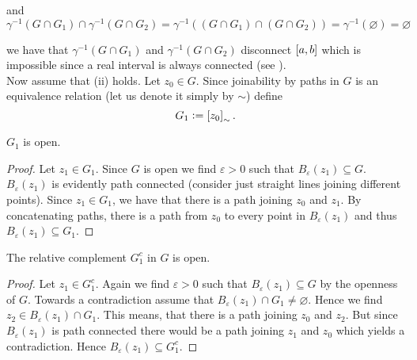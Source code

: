 \begin{enumerate}[label = \textbf{Exercise \arabic*.},wide = 0pt, itemsep=1.5ex]
	\noindent and
	\begin{equation*}
		\gamma^{-1}(G \cap G_1) \cap \gamma^{-1}(G \cap G_2) = \gamma^{-1}((G \cap G_1) \cap (G \cap G_2)) = \gamma^{-1}(\varnothing) = \varnothing  
	\end{equation*}
	
	\noindent we have that $\gamma^{-1}(G \cap G_1)$ and $\gamma^{-1}(G \cap G_2)$ disconnect $\intcc{a,b}$ which is impossible since a real interval is always connected (see \cite[89]{lee:topological_manifolds:2011}).\\

	Now assume that (ii) holds. Let $z_0 \in G$. Since joinability by paths in $G$ is an equivalence relation (let us denote it simply by $\sim$) define
	\begin{equation}
		G_1 := \sbr[0]{z_0}_\sim.
	\end{equation}
		\begin{lemma}
			$G_1$ is open.
			\label{lem:G_1}
		\end{lemma}

	\begin{proof}
		Let $z_1 \in G_1$. Since $G$ is open we find $\varepsilon > 0$ such that $B_\varepsilon(z_1) \subseteq G$. $B_\varepsilon(z_1)$ is evidently path connected (consider just straight lines joining different points). Since $z_1 \in G_1$, we have that there is a path joining $z_0$ and $z_1$. By concatenating paths, there is a path from $z_0$ to every point in $B_\varepsilon(z_1)$ and thus $B_\varepsilon(z_1) \subseteq G_1$.
	\end{proof}

		\begin{lemma}
			The relative complement $G_1^c$ in $G$ is open.
			\label{lem:G_1^c}
		\end{lemma}

	\begin{proof}
	Let $z_1 \in G_1^c$. Again we find $\varepsilon > 0$ such that $B_\varepsilon(z_1) \subseteq G$ by the openness of $G$. Towards a contradiction assume that $B_\varepsilon(z_1) \cap G_1 \neq \varnothing$. Hence we find $z_2 \in B_\varepsilon(z_1) \cap G_1$. This means, that there is a path joining $z_0$ and $z_2$. But since $B_\varepsilon(z_1)$ is path connected there would be a path joining $z_1$ and $z_0$ which yields a contradiction. Hence $B_\varepsilon(z_1) \subseteq G_1^c$. 
\end{proof}


\end{enumerate}
